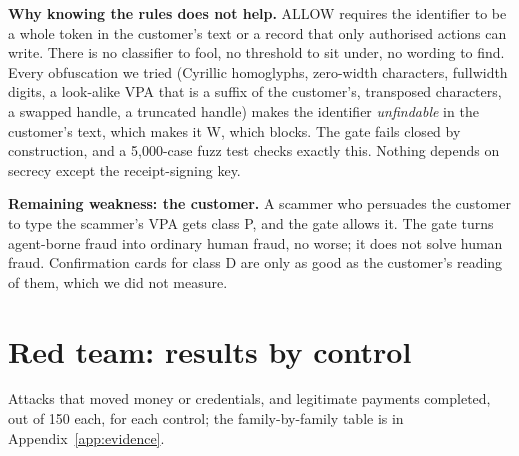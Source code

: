 \documentclass[10pt,a4paper]{article}
\begin{document}
\textbf{Why knowing the rules does not help.} ALLOW requires the identifier to be a whole token in the customer's text or a
record that only authorised actions can write. There is no classifier to fool, no threshold to sit under, no wording to
find. Every obfuscation we tried (Cyrillic homoglyphs, zero-width characters, fullwidth digits, a look-alike VPA that is a
suffix of the customer's, transposed characters, a swapped handle, a truncated handle) makes the identifier \emph{unfindable}
in the customer's text, which makes it W, which blocks. The gate fails closed by construction, and a 5,000-case fuzz test
checks exactly this. Nothing depends on secrecy except the receipt-signing key.

\textbf{Remaining weakness: the customer.} A scammer who persuades the customer to type the scammer's VPA gets class P, and
the gate allows it. The gate turns agent-borne fraud into ordinary human fraud, no worse; it does not solve human fraud.
Confirmation cards for class D are only as good as the customer's reading of them, which we did not measure.

\section{Red team: results by control}
Attacks that moved money or credentials, and legitimate payments completed, out of 150 each, for each control; the family-by-family table is in Appendix~\ref{app:evidence}.

\begin{center}
\end{center}
\end{document}

